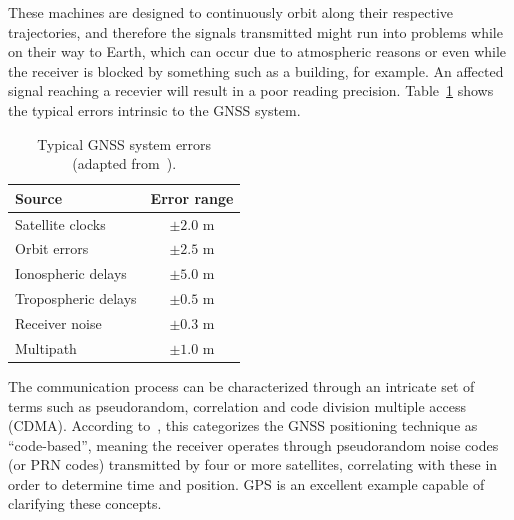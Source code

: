 These machines are designed to continuously orbit along their respective trajectories, and therefore the signals transmitted might run into problems while on their way to Earth, which can occur due to atmospheric reasons or even while the receiver is blocked by something such as a building, for example. An affected signal reaching a recevier will result in a poor reading precision. Table~\ref{tab:GNSS_sys_errors} shows the typical errors intrinsic to the GNSS system.

\begingroup
\begin{table}[h]
	\caption{Typical GNSS system errors (adapted from~\cite{novatel_gnss}).}
	\label{tab:GNSS_sys_errors}
	\centering%
	\begin{tabular}{lc}
        \toprule
        \textbf{Source} & \textbf{Error range} \\
        \midrule     
        Satellite clocks & $\pm 2.0$ m \\
        \midrule
        Orbit errors & $\pm 2.5$ m \\
        \midrule
        Ionospheric delays & $\pm 5.0$ m \\
        \midrule
        Tropospheric delays & $\pm 0.5$ m \\
        \midrule
        Receiver noise & $\pm 0.3$ m \\
        \midrule
        Multipath & $\pm 1.0$ m \\
        \bottomrule
    \end{tabular}
\end{table}
\endgroup

The communication process can be characterized through an intricate set of terms such as \gls{pseudorandom}, \gls{correlation} and code division multiple access (CDMA). According to~\cite{novatel_gnss}, this categorizes the GNSS positioning technique as ``code-based'', meaning the receiver operates through pseudorandom noise codes (or PRN codes) transmitted by four or more satellites, correlating with these in order to determine time and position. GPS is an excellent example capable of clarifying these concepts.

